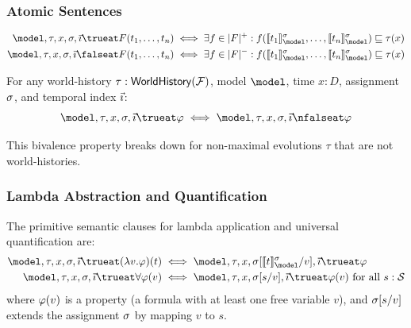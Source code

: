 \documentclass[../LogosReference.tex]{subfiles}
\begin{document}
\subsubsection{Atomic Sentences}

\begin{definition}\label{def:atomic-truth}
	\begin{align}
		\model, \tau, x, \assignment, \tempindex \trueat F(t_1, \ldots, t_n)  & \iff \exists f \in \verifierset{F} : f(\sem{t_1}^\assignment_\model, \ldots, \sem{t_n}^\assignment_\model) \parthood \tau(x)  \\
		\model, \tau, x, \assignment, \tempindex \falseat F(t_1, \ldots, t_n) & \iff \exists f \in \falsifierset{F} : f(\sem{t_1}^\assignment_\model, \ldots, \sem{t_n}^\assignment_\model) \parthood \tau(x)
	\end{align}
\end{definition}

\begin{theorem}\label{thm:bivalence}
For any world-history $\tau : \mathsf{WorldHistory}(\mathcal{F})$, model $\model$, time $x : D$, assignment $\sigma$, and temporal index $\vec{\imath}$:
\[
    \model, \tau, x, \assignment, \tempindex \trueat \metaA \iff \model, \tau, x, \assignment, \tempindex \nfalseat \metaA
\]
\end{theorem}

\begin{remark}
This bivalence property breaks down for non-maximal evolutions $\tau$ that are not world-histories.
\end{remark}

\subsubsection{Lambda Abstraction and Quantification}


\begin{definition}\label{def:lambda-quant-truth}
The primitive semantic clauses for lambda application and universal quantification are:
\begin{align}
    \model, \tau, x, \assignment, \tempindex \trueat (\lambda v.\metaA)(t) &\iff \model, \tau, x, \assignsub{\sem{t}^\assignment_\model}{v}, \tempindex \trueat \metaA \\
    \model, \tau, x, \assignment, \tempindex \trueat \forall\metaA(v) &\iff \model, \tau, x, \assignsub{s}{v}, \tempindex \trueat \metaA(v) \text{ for all } s : \statespace
\end{align}
  where $\varphi(v)$ is a property (a formula with at least one free variable $v$), and $\sigma[s/v]$ extends the assignment $\sigma$ by mapping $v$ to $s$.
\end{definition}
\end{document}
